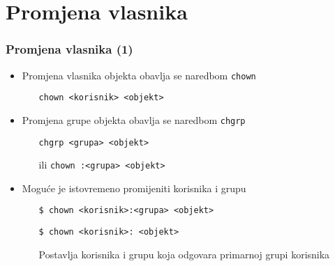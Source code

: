 \documentclass[table,usenames,dvipsnames]{beamer}
\newcommand{\shell}[1]{\texttt{#1}}
\begin{document}
\section{Promjena vlasnika}
\begin{frame}[t]
\frametitle{Promjena vlasnika (1)}
\begin{itemize}
  \item Promjena vlasnika objekta obavlja se naredbom \shell{chown}
  \begin{itemize}
    \item[] \shell{chown <korisnik> <objekt>}
  \end{itemize}
	\item Promjena grupe objekta obavlja se naredbom \shell{chgrp}
	\begin{itemize}
		\item[] \shell{chgrp <grupa> <objekt>}
		\item[ili] \shell{chown :<grupa> <objekt>}
	\end{itemize}
\end{itemize}
\vfill
\begin{itemize}
  \item Moguće je istovremeno promijeniti korisnika i grupu
  \begin{itemize}
    \item[] \shell{\$ chown <korisnik>:<grupa> <objekt>}
    \item[] \vspace{1em} \shell{\$ chown <korisnik>: <objekt>}
	\item[] Postavlja korisnika i grupu koja odgovara primarnoj grupi korisnika
  \end{itemize}
\end{itemize}
\end{frame}
\end{document}
